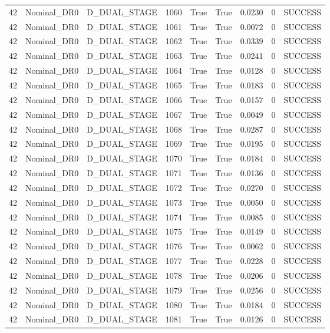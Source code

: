 \documentclass[11pt,a4paper,oneside]{book}
\begin{document}
\begin{longtable}{l l l l l l l l l}
42 & Nominal\_DR0 & D\_DUAL\_STAGE & 1060 & True & True & 0.0230 & 0 & SUCCESS \\
42 & Nominal\_DR0 & D\_DUAL\_STAGE & 1061 & True & True & 0.0072 & 0 & SUCCESS \\
42 & Nominal\_DR0 & D\_DUAL\_STAGE & 1062 & True & True & 0.0339 & 0 & SUCCESS \\
42 & Nominal\_DR0 & D\_DUAL\_STAGE & 1063 & True & True & 0.0241 & 0 & SUCCESS \\
42 & Nominal\_DR0 & D\_DUAL\_STAGE & 1064 & True & True & 0.0128 & 0 & SUCCESS \\
42 & Nominal\_DR0 & D\_DUAL\_STAGE & 1065 & True & True & 0.0183 & 0 & SUCCESS \\
42 & Nominal\_DR0 & D\_DUAL\_STAGE & 1066 & True & True & 0.0157 & 0 & SUCCESS \\
42 & Nominal\_DR0 & D\_DUAL\_STAGE & 1067 & True & True & 0.0049 & 0 & SUCCESS \\
42 & Nominal\_DR0 & D\_DUAL\_STAGE & 1068 & True & True & 0.0287 & 0 & SUCCESS \\
42 & Nominal\_DR0 & D\_DUAL\_STAGE & 1069 & True & True & 0.0195 & 0 & SUCCESS \\
42 & Nominal\_DR0 & D\_DUAL\_STAGE & 1070 & True & True & 0.0184 & 0 & SUCCESS \\
42 & Nominal\_DR0 & D\_DUAL\_STAGE & 1071 & True & True & 0.0136 & 0 & SUCCESS \\
42 & Nominal\_DR0 & D\_DUAL\_STAGE & 1072 & True & True & 0.0270 & 0 & SUCCESS \\
42 & Nominal\_DR0 & D\_DUAL\_STAGE & 1073 & True & True & 0.0050 & 0 & SUCCESS \\
42 & Nominal\_DR0 & D\_DUAL\_STAGE & 1074 & True & True & 0.0085 & 0 & SUCCESS \\
42 & Nominal\_DR0 & D\_DUAL\_STAGE & 1075 & True & True & 0.0149 & 0 & SUCCESS \\
42 & Nominal\_DR0 & D\_DUAL\_STAGE & 1076 & True & True & 0.0062 & 0 & SUCCESS \\
42 & Nominal\_DR0 & D\_DUAL\_STAGE & 1077 & True & True & 0.0228 & 0 & SUCCESS \\
42 & Nominal\_DR0 & D\_DUAL\_STAGE & 1078 & True & True & 0.0206 & 0 & SUCCESS \\
42 & Nominal\_DR0 & D\_DUAL\_STAGE & 1079 & True & True & 0.0256 & 0 & SUCCESS \\
42 & Nominal\_DR0 & D\_DUAL\_STAGE & 1080 & True & True & 0.0184 & 0 & SUCCESS \\
42 & Nominal\_DR0 & D\_DUAL\_STAGE & 1081 & True & True & 0.0126 & 0 & SUCCESS \\

\end{longtable}
\end{document}
